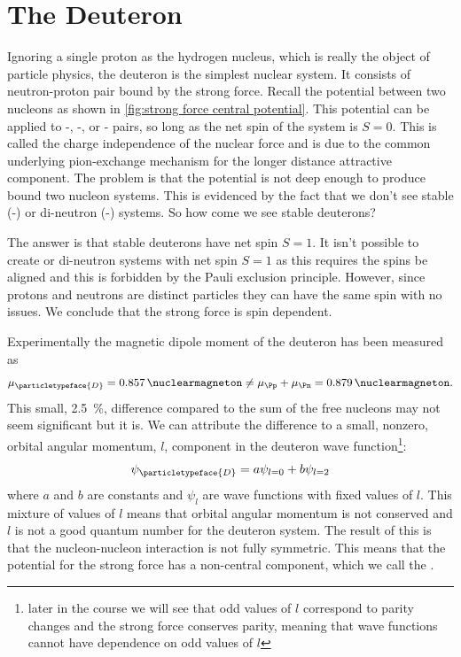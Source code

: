 \documentclass[fleqn]{NotesClass}
\newcommand{\Pdeuteron}{\ensuremath{\particletypeface{D}}}
\begin{document}
    \chapter{The Deuteron}
    Ignoring a single proton as the hydrogen nucleus, which is really the object of particle physics, the deuteron is the simplest nuclear system.
    It consists of neutron-proton pair bound by the strong force.
    Recall the potential between two nucleons as shown in \cref{fig:strong force central potential}.
    This potential can be applied to \Pn-\Pn, \Pp-\Pp, or \Pn-\Pp{} pairs, so long as the net spin of the system is \(S = 0\).
    This is called the charge independence of the nuclear force and is due to the common underlying pion-exchange mechanism for the longer distance attractive component.
    The problem is that the potential is not deep enough to produce bound two nucleon systems.
    This is evidenced by the fact that we don't see stable  (\Pp-\Pp) or di-neutron (\Pn-\Pn) systems.
    So how come we see stable deuterons?
    
    The answer is that stable deuterons have net spin \(S = 1\).
    It isn't possible to create  or di-neutron systems with net spin \(S = 1\) as this requires the spins be aligned and this is forbidden by the Pauli exclusion principle.
    However, since protons and neutrons are distinct particles they can have the same spin with no issues.
    We conclude that the strong force is spin dependent.
    
    Experimentally the magnetic dipole moment of the deuteron has been measured as
    \begin{equation}
        \mu_{\Pdeuteron} = \qty{0.857}{\nuclearmagneton} \ne \mu_{\Pp} + \mu_{\Pn} = \qty{0.879}{\nuclearmagneton}.
    \end{equation}
    This small, \qty{2.5}{\percent}, difference compared to the sum of the free nucleons may not seem significant but it is.
    We can attribute the difference to a small, nonzero, orbital angular momentum, \(l\), component in the deuteron wave function\footnote{later in the course we will see that odd values of \(l\) correspond to parity changes and the strong force conserves parity, meaning that wave functions cannot have dependence on odd values of \(l\)}:
    \begin{equation}
        \psi_{\Pdeuteron} = a\psi_{l=0} + b\psi_{l=2}
    \end{equation}
    where \(a\) and \(b\) are constants and \(\psi_{l}\) are wave functions with fixed values of \(l\).
    This mixture of values of \(l\) means that orbital angular momentum is not conserved and \(l\) is not a good quantum number for the deuteron system.
    The result of this is that the nucleon-nucleon interaction is not fully symmetric.
    This means that the potential for the strong force has a non-central component, which we call the .
    
\end{document}
